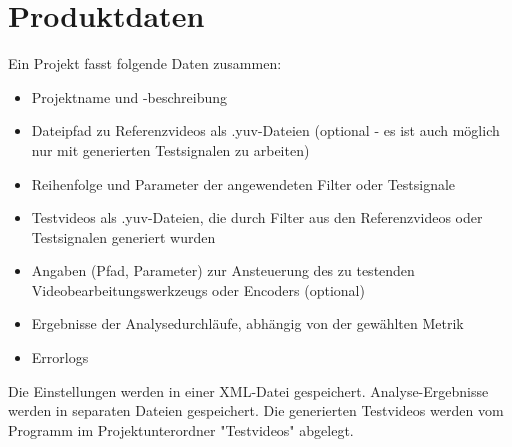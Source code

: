 

\chapter{Produktdaten}
Ein Projekt fasst folgende Daten zusammen:
	\begin{itemize}
		\item Projektname und -beschreibung
		\item Dateipfad zu Referenzvideos als .yuv-Dateien (optional - es ist auch möglich nur mit generierten
		 Testsignalen zu arbeiten)
		\item Reihenfolge und Parameter der angewendeten Filter oder Testsignale
	        \item Testvideos als .yuv-Dateien, die durch Filter aus den Referenzvideos oder Testsignalen
	         generiert wurden
	        \item Angaben (Pfad, Parameter) zur Ansteuerung des zu testenden Videobearbeitungswerkzeugs 
	        oder Encoders (optional)
		\item Ergebnisse der Analysedurchläufe, abhängig von der gewählten Metrik
		\item Errorlogs
	\end{itemize}
Die Einstellungen werden in einer XML-Datei gespeichert. Analyse-Ergebnisse werden in separaten Dateien
 gespeichert. Die generierten Testvideos werden vom Programm im Projektunterordner "Testvideos" abgelegt.


